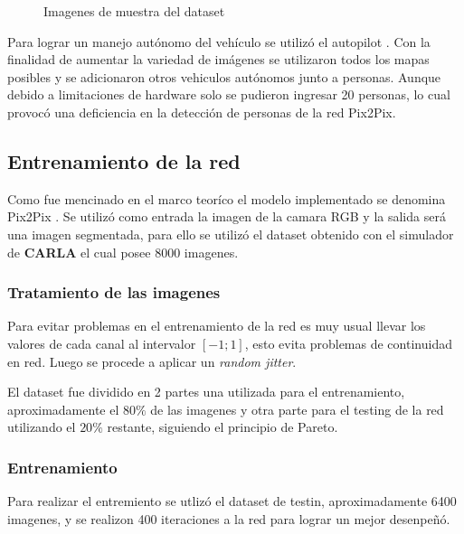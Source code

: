 \documentclass[]{IEEEtran}
\begin{document}
    \begin{figure}
        \centering
        \caption{Imagenes de muestra del dataset}
        \label{fig:dataset}
    \end{figure}

    Para lograr un manejo autónomo del vehículo se utilizó el autopilot \cite{CARLA-Documentation}. 
    Con la finalidad de aumentar la variedad de imágenes se utilizaron todos los mapas posibles y 
    se adicionaron otros vehiculos autónomos junto a personas. Aunque debido 
    a limitaciones de hardware solo se pudieron ingresar 20 personas, lo cual 
    provocó una deficiencia en la detección de personas de la red Pix2Pix. 

    \subsection{Entrenamiento de la red}

    Como fue mencinado en el marco teoríco el modelo implementado se denomina Pix2Pix \cite{Pix2Pix}.
    Se utilizó como entrada la imagen de la camara RGB y la salida será una imagen segmentada, para ello se utilizó
    el dataset obtenido con el simulador de \textbf{CARLA} el cual posee 8000 imagenes. 

    \subsubsection{Tratamiento de las imagenes}

    Para evitar problemas en el entrenamiento de la red es muy usual llevar los valores de cada canal al 
    intervalor $[-1;1]$, esto evita problemas de continuidad en red. Luego 
    se procede a aplicar un \textit{random jitter}.

    El dataset fue dividido en 2 partes una utilizada para el entrenamiento, aproximadamente el $80 \% $ de las imagenes y 
    otra parte para el testing de la red utilizando el $20 \%$ restante, siguiendo el principio de Pareto.

    \subsubsection{Entrenamiento}

    Para realizar el entremiento se utlizó el dataset de testin, aproximadamente 6400 imagenes, 
    y se realizon 400 iteraciones a la red para lograr un mejor desenpeñó. 
    
\end{document}
